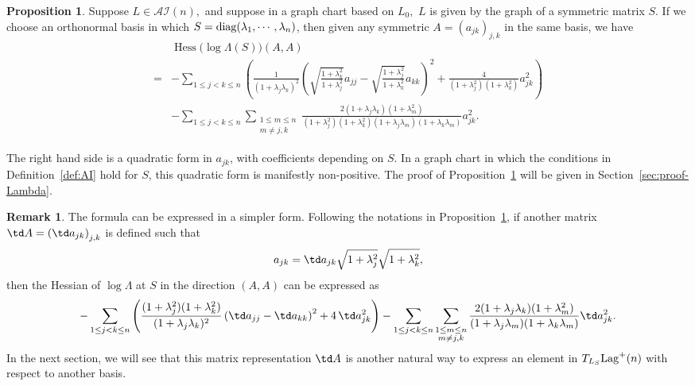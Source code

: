\documentclass[11pt]{amsart}
\numberwithin{equation}{section}
\theoremstyle{definition}
\theoremstyle{definition}
\newtheorem{prop}[equation]{Proposition} %
\newtheorem{remark}[equation]{Remark}
\newcommand{\pr}[1]{\left(#1\right)}
\begin{document}
\begin{prop}
	\label{prop:Hess-n-dim}
	Suppose $L\in \mathcal{AI}(n),$ and suppose in a graph chart based on $L_0,$ $L$ is given by the graph of a symmetric matrix $S.$
	If we choose an orthonormal basis in which $S={\rm diag}(\lambda_1,\cdots,\lambda_n)$, then given any symmetric $A=\pr{a_{jk}}_{j,k}$ in the same basis, we have
	\begin{align*}
	&\operatorname{Hess}\big(\log \Lambda(S)\big)(A, A)\\
	= & 
	-\sum_{1\le j<k\le n} \pr{\frac 1{(1+\lambda_j\lambda_k)^2} 
		\pr{\sqrt{\frac{1+\lambda_k^2}{1+\lambda_j^2}}a_{jj} - \sqrt{\frac{1+\lambda_j^2}{1+\lambda_k^2}}a_{kk}}^2
		+ \frac{4}{\pr{1+\lambda_j^2}\pr{1+\lambda_k^2}} a_{jk}^2}\\
	& - \sum_{1\le j<k\le n} 
	\sum_{\substack{1\le m\le n\\ m\neq j,k}} 
	\frac{2(1+\lambda_j\lambda_k)(1+\lambda_m^2)}
	{(1+\lambda_j^2)(1+\lambda_k^2)(1+\lambda_j\lambda_m)(1+\lambda_k\lambda_m)}
	a_{jk}^2.
	\end{align*}
\end{prop}
The right hand side is a quadratic form in $a_{jk}$, with coefficients depending on $S$.
In a graph chart in which the conditions in Definition~\ref{def:AI} hold for $S$, this quadratic form is manifestly non-positive.
The proof of Proposition~\ref{prop:Hess-n-dim} will be given in Section~\ref{sec:proof-Lambda}.


\begin{remark}
	\label{rmk:Hess-different-basis}
	The formula can be expressed in a simpler form.
	Following the notations in Proposition~\ref{prop:Hess-n-dim}, if another matrix $\td A=\pr{\td a_{jk}}_{j,k}$ is defined such that
	\begin{align*}
	a_{jk}
	= \td a_{jk} \sqrt{1+\lambda_j^2} \sqrt{1+\lambda_k^2},
	\end{align*}
	then the Hessian of $\log\Lambda$ at $S$ in the direction $(A,A)$ can be expressed as
	\begin{align*}
	-\sum_{1\le j<k\le n} 
	\pr{
	\frac{(1+\lambda_j^2)(1+\lambda_k^2)}{(1+\lambda_j\lambda_k)^2}\pr{\td a_{jj}-\td a_{kk}}^2
	+ 4\,\td a_{jk}^2
	}
	- \sum_{1\le j<k\le n} 
	\sum_{\substack{1\le m\le n\\ m\neq j,k}} 
	\frac{2(1+\lambda_j\lambda_k)(1+\lambda_m^2)}
	{(1+\lambda_j\lambda_m)(1+\lambda_k\lambda_m)}
	\td a_{jk}^2.
	\end{align*}
	In the next section, we will see that this matrix representation $\td A$ is another natural way to express an element in $T_{L_S}{\rm Lag}^+(n)$ with respect to another basis.
\end{remark}
\end{document}
